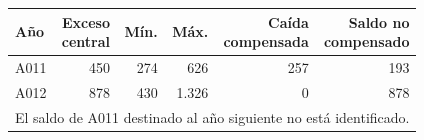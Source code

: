 \begin{tabular}{lrrrrr}
\toprule
Año & \makecell{Exceso\\central} & Mín. & Máx. & \makecell{Caída\\compensada} & \makecell{Saldo no\\compensado} \\
\midrule
A011 & 450 & 274 & 626 & 257 & 193 \\
A012 & 878 & 430 & 1.326 & 0 & 878 \\
\midrule
\multicolumn{6}{l}{\footnotesize El saldo de A011 destinado al año siguiente no está identificado.} \\
\bottomrule
\end{tabular}
